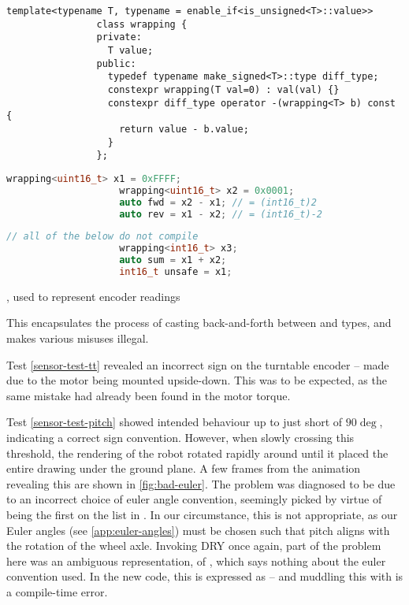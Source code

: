\documentclass[main.tex]{subfiles}
\begin{document}
		\begin{listingfloat}
			\begin{lstlisting}[language={[11]c++},frame=single,gobble=8]
				template<typename T, typename = enable_if<is_unsigned<T>::value>>
				class wrapping {
				private:
				  T value;
				public:
				  typedef typename make_signed<T>::type diff_type;
				  constexpr wrapping(T val=0) : val(val) {}
				  constexpr diff_type operator -(wrapping<T> b) const {
				    return value - b.value;
				  }
				};
			\end{lstlisting}%
			\begin{minipage}[t]{0.5\linewidth-1em}
				\begin{lstlisting}[language=c++,frame=single,gobble=10]
					wrapping<uint16_t> x1 = 0xFFFF;
					wrapping<uint16_t> x2 = 0x0001;
					auto fwd = x2 - x1; // = (int16_t)2
					auto rev = x1 - x2; // = (int16_t)-2
				\end{lstlisting}
			\end{minipage}\hfill
			\begin{minipage}[t]{0.5\linewidth-1em}
				\begin{lstlisting}[language=c++,frame=single,gobble=10]
					// all of the below do not compile
					wrapping<int16_t> x3;
					auto sum = x1 + x2;
					int16_t unsafe = x1;
				\end{lstlisting}
			\end{minipage}\hfill
			\caption{, used to represent encoder readings}
			\label{listing:wrapping}
			\medskip
			\small
			This encapsulates the process of casting back-and-forth between  and  types, and makes various misuses illegal.
		\end{listingfloat}

		Test \ref{sensor-test-tt} revealed an incorrect sign on the turntable encoder -- made due to the motor being mounted upside-down.
		This was to be expected, as the same mistake had already been found in the motor torque.

		Test \ref{sensor-test-pitch} showed intended behaviour up to just short of $90\deg$, indicating a correct sign convention.
		However, when slowly crossing this threshold, the rendering of the robot rotated rapidly around until it placed the entire drawing under the ground plane.
		A few frames from the animation revealing this are shown in \cref{fig:bad-euler}.
		The problem was diagnosed to be due to an incorrect choice of euler angle convention, seemingly picked by virtue of being the first on the list in \cite{diebel2006representing}.
		In our circumstance, this is not appropriate, as our Euler angles (see \cref{app:euler-angles}) must be chosen such that pitch aligns with the rotation of the wheel axle.
		Invoking DRY once again, part of the problem here was an ambiguous representation, of , which says nothing about the euler convention used.
		In the new code, this is expressed as  -- and muddling this with  is a compile-time error.
\end{document}

